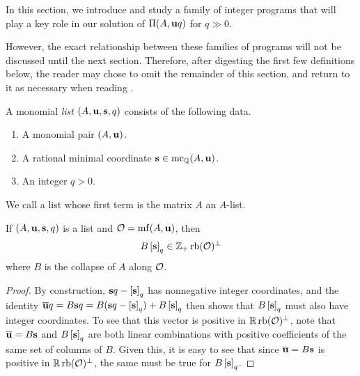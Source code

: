 \documentclass[11pt]{amsart}
\begin{document}
In this section, we introduce and study a family of integer programs that will play a key role in our solution of $\Pi(A, \mathbf{u}q)$ for $q \gg 0$.    

However, the exact relationship between these families of programs will not be discussed until the next section.  Therefore, after digesting the first few definitions below, the reader may chose to omit the remainder of this section, and return to it as necessary when reading .  

\begin{definition}
A monomial \emph{list} $(A, \mathbf{u}, \mathbf{s}, q)$ consists of the following data.
\begin{enumerate}
\item A monomial pair $(A, \mathbf{u})$.
\item A rational minimal coordinate $\mathbf{s} \in \operatorname{mc}_{\mathbb{Q}}(A, \mathbf{u})$.
\item An integer $q>0$.
\end{enumerate}
\end{definition}

\begin{definition}
We call a list whose first term is the matrix $A$ an $A$-list.
\end{definition}


\begin{lemma}
\label{tail projection: L}
If $(A, \mathbf{u}, \mathbf{s}, q)$ is a list and $\mathcal{O} = \operatorname{mf}(A, \mathbf{u})$, then 
\[ B\left[ \mathbf{s} \right]_q \in \mathbb{Z}_+ \operatorname{rb}(\mathcal{O})^{\perp} \]
where $B$ is the collapse of $A$ along $\mathcal{O}$.
\end{lemma}

\begin{proof}  By construction, $\mathbf{s}q - \left[ \mathbf{s} \right]_q $ has nonnegative integer coordinates, and the identity 
$\overline{\mathbf{u}} q =B \mathbf{s} q = B ( \mathbf{s}q - \left[ \mathbf{s} \right]_q ) +B \left[ \mathbf{s} \right]_q$ then shows that $B \left[ \mathbf{s} \right]_q$ must also have integer coordinates.   To see that this vector is positive in $\mathbb{R} \operatorname{rb}(\mathcal{O})^{\perp}$, note that $\overline{\mathbf{u}} = B \mathbf{s}$ and $B \left[ \mathbf{s} \right]_q$ are both linear combinations with positive coefficients of the same set of columns of $B$.  Given this, it is easy to see that since $\overline{\mathbf{u}} = B \mathbf{s}$ is positive in $\mathbb{R} \operatorname{rb}(\mathcal{O})^{\perp}$, the same must be true for $B \left[ \mathbf{s} \right]_q$.
\end{proof}
\end{document}
